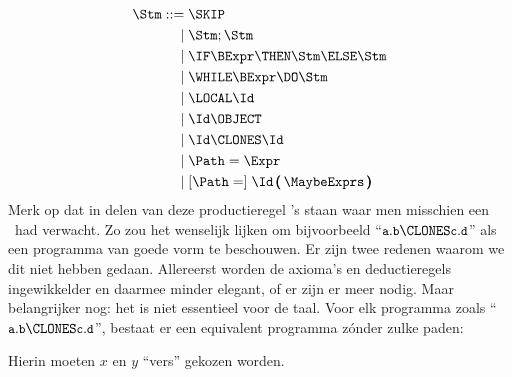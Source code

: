 %
\begin{align*}
  \Stm \GrammarDef \SKIP \\
  \GrammarOr \Stm; \Stm \\
  \GrammarOr \IF \BExpr \THEN \Stm \ELSE \Stm \\
  \GrammarOr \WHILE \BExpr \DO \Stm \\
  \GrammarOr \LOCAL \Id \\
  \GrammarOr \Id \OBJECT \\
  \GrammarOr \Id \CLONES \Id \\
  \GrammarOr \Path = \Expr \\
  \GrammarOr \GrammarOpt{\Path =} \Id\,\pmb{(}\,\MaybeExprs\,\pmb{)}
\end{align*}
%
Merk op dat in delen van deze productieregel \Id's staan waar men misschien een \Path\ had verwacht. Zo zou het wenselijk lijken om bijvoorbeeld ``$\id{a}.\id{b} \CLONES \id{c}.\id{d}$'' als een programma van goede vorm te beschouwen. Er zijn twee redenen waarom we dit niet hebben gedaan. Allereerst worden de axioma's en deductieregels ingewikkelder en daarmee minder elegant, of er zijn er meer nodig. Maar belangrijker nog: het is niet essentieel voor de taal. Voor elk programma zoals ``$\id{a}.\id{b} \CLONES \id{c}.\id{d}$'', bestaat er een equivalent programma zónder zulke paden:

\begin{htmlskip}
  \begin{minipage}[t]{.5\textwidth}
    \newCodeFragment
  \end{minipage}
  \begin{minipage}[t]{.5\textwidth}
    \newCodeFragment
  \end{minipage}
\end{htmlskip}

Hierin moeten $x$ en $y$ ``vers'' gekozen worden.

